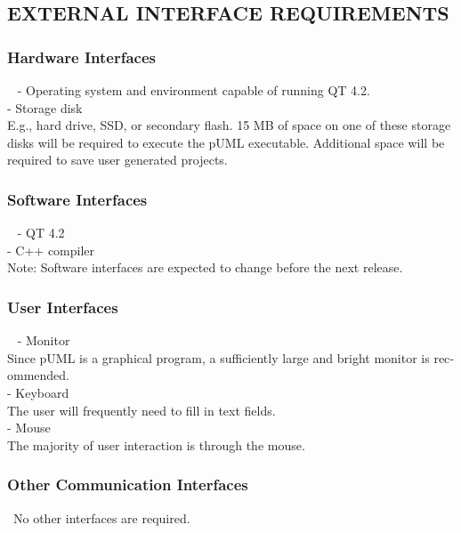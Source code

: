 \documentclass[twoside,letterpaper]{article}
\begin{document}
\subsection[EXTERNAL INTERFACE REQUIREMENTS]{\rmfamily\bfseries\color{black}
EXTERNAL INTERFACE REQUIREMENTS}

\subsubsection[Hardware Interfaces]{\rmfamily\bfseries\color{black}
Hardware Interfaces}
{\color{black}
\foreignlanguage{english}{\ }\foreignlanguage{english}
{
- Operating system and environment capable of running QT 4.2.
\\- Storage disk
\\  E.g., hard drive, SSD, or secondary flash. 15 MB of space on one of these storage disks will be required
to execute the pUML executable. Additional space will be required to save user generated projects.}}

\subsubsection[Software Interfaces]{\rmfamily\bfseries\color{black}
Software Interfaces}
{\color{black} \foreignlanguage{english}{\ }\foreignlanguage{english}
{
- QT 4.2
\\- C++ compiler
\\  Note: Software interfaces are expected to change before the next release.
}}

\subsubsection[User Interfaces]{\rmfamily\bfseries\color{black}
User Interfaces}
{\color{black}
\foreignlanguage{english}{\ }\foreignlanguage{english}
{
- Monitor
\\  Since pUML is a graphical program, a sufficiently large and bright monitor is recommended.
\\- Keyboard
\\  The user will frequently need to fill in text fields.
\\- Mouse
\\  The majority of user interaction is through the mouse.}}

\subsubsection[Other Communication
Interfaces]{\rmfamily\bfseries\color{black}
Other Communication Interfaces}
{\color{black}
\foreignlanguage{english}{\ }\foreignlanguage{english}{No other interfaces are required. }}
\end{document}

